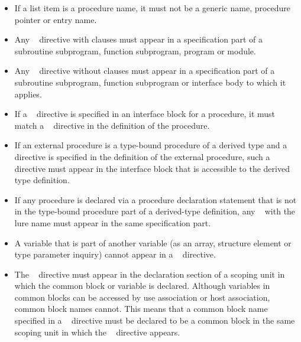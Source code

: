 \begin{fortranspecific}
\begin{itemize}
\item If a list item is a procedure name, it must not be a generic name,
      procedure pointer or entry name.

\item Any ~ directive with clauses must appear
      in a specification part of a subroutine subprogram, function subprogram,
      program or module.

\item Any ~ directive without clauses must appear
      in a specification part of a subroutine subprogram, function subprogram
      or interface body to which it applies.

\item If a ~ directive is specified in an
      interface block for a procedure, it must match a
      ~ directive in the definition of the
      procedure.

\item If an external procedure is a type-bound procedure of a derived
      type and a ~ directive is specified in
      the definition of the external procedure, such a directive must
      appear in the interface block that is accessible to the derived
      type definition.

\item If any procedure is declared via a procedure declaration statement
      that is not in the type-bound procedure part of a derived-type
      definition, any ~ with the lure
      name must appear in the same specification part.

\item A variable that is part of another variable (as an array, structure
      element or type parameter inquiry) cannot appear in a
      ~ directive.

\item The ~ directive must appear in the
      declaration section of a scoping unit in which the common block
      or variable is declared. Although variables in common blocks can
      be accessed by use association or host association, common block
      names cannot. This means that a common block name specified in a
      ~ directive must be declared to be a
      common block in the same scoping unit in which the
      ~ directive appears.


\end{itemize}
\end{fortranspecific}
